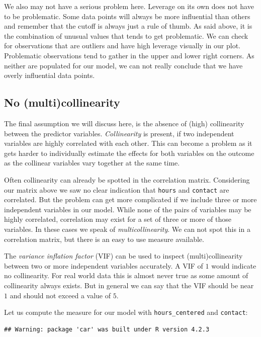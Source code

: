 \documentclass[
]{book}
\begin{document}
We also may not have a serious problem here. Leverage on its own does not have to be problematic. Some data points will always be more influential than others and remember that the cutoff is always just a rule of thumb. As said above, it is the combination of unusual values that tends to get problematic. We can check for observations that are outliers and have high leverage visually in our plot. Problematic observations tend to gather in the upper and lower right corners. As neither are populated for our model, we can not really conclude that we have overly influential data points.

\hypertarget{no-multicollinearity}{%
\subsection{No (multi)collinearity}\label{no-multicollinearity}}

The final assumption we will discuss here, is the absence of (high) collinearity between the predictor variables. \emph{Collinearity} is present, if two independent variables are highly correlated with each other. This can become a problem as it gets harder to individually estimate the effects for both variables on the outcome as the collinear variables vary together at the same time.

Often collinearity can already be spotted in the correlation matrix. Considering our matrix above we saw no clear indication that \texttt{hours} and \texttt{contact} are correlated. But the problem can get more complicated if we include three or more independent variables in our model. While none of the pairs of variables may be highly correlated, correlation may exist for a set of three or more of those variables. In these cases we speak of \emph{multicollinearity}. We can not spot this in a correlation matrix, but there is an easy to use measure available.

The \emph{variance inflation factor} (VIF) can be used to inspect (multi)collinearity between two or more independent variables accurately. A VIF of \(1\) would indicate no collinearity. For real world data this is almost never true as some amount of collinearity always exists. But in general we can say that the VIF should be near \(1\) and should not exceed a value of \(5\).

Let us compute the measure for our model with \texttt{hours\_centered} and \texttt{contact}:

\begin{verbatim}
## Warning: package 'car' was built under R version 4.2.3
\end{verbatim}
\end{document}
